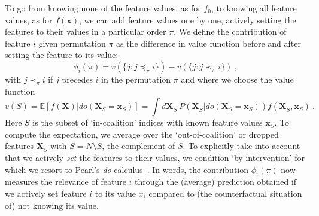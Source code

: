 \documentclass{article}
\newcommand{\vX}{\mathbf{X}}
\newcommand{\vx}{\mathbf{x}}
\newcommand{\expectation}{\mathbb{E}}
\newcommand{\contribution}{{\phi}}
\newcommand{\val}{{v}}
\newcommand{\dodo}{\mathit{do}}
\newcommand{\lvdo}[1]{\dodo(\vX_{#1} = \vx_{#1})}
\newcommand{\perm}{\pi}
\newcommand{\operator}{\mathit{op}}
\newcommand{\allfeatures}{{N}}
\begin{document}
To go from knowing none of the feature values, as for $f_0$, to knowing all feature values, as for $f(\vx)$, we can add feature values one by one, actively setting the features to their values in a particular order $\perm$.
We define the contribution of feature $i$ given permutation $\perm$ as the difference in value function before and after setting the feature to its value:
\begin{equation}
\contribution_i(\perm) = \val(\{j: j \preceq_\perm i\}) - \val(\{j: j \prec_\perm i\}) \: ,
\label{eq:contperm}
\end{equation}
with $j \prec_\perm i$ if $j$ precedes $i$ in the permutation $\perm$
and where we choose the value function
\begin{equation}
\val(S) = \expectation \left[f(\vX) | \lvdo{S} \right] = \int d\vX_{\bar{S}} \: P(\vX_{\bar{S}}|\lvdo{S}) f(\vX_{\bar{S}},\vx_S) \: .
\label{eq:valuedef}
\end{equation}
Here $S$ is the subset of `in-coalition' indices with known feature values $\vx_S$. To compute the expectation, we average over the `out-of-coalition' or dropped features $\vX_{\bar{S}}$ with $\bar{S} = \allfeatures \setminus S$, the complement of $S$. To explicitly take into account that we actively {\em set} the features to their values, we condition `by intervention' 
for which we resort to Pearl's \textit{do}-calculus~\cite{pearl1995causal}. In words, the contribution $\contribution_i(\perm)$ now measures the relevance of feature $i$ through the (average) prediction obtained if we actively set feature $i$ to its value $x_i$ compared to (the counterfactual situation of) not knowing its value.
\end{document}
